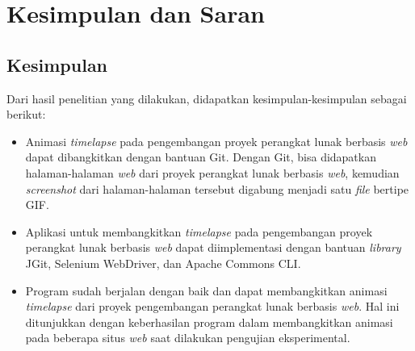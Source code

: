 \chapter{Kesimpulan dan Saran}
\label{chap:kesimpulan_dan_saran}

\section{Kesimpulan}
\label{sec:kesimpulan}
Dari hasil penelitian yang dilakukan, didapatkan kesimpulan-kesimpulan sebagai berikut:
\begin{itemize}
\item Animasi \textit{timelapse} pada pengembangan proyek perangkat lunak berbasis \textit{web} dapat dibangkitkan dengan bantuan Git. Dengan Git, bisa didapatkan halaman-halaman \textit{web} dari proyek perangkat lunak berbasis \textit{web}, kemudian \textit{screenshot} dari halaman-halaman tersebut digabung menjadi satu \textit{file} bertipe GIF.
\item  Aplikasi untuk membangkitkan \textit{timelapse} pada pengembangan proyek perangkat lunak berbasis \textit{web} dapat diimplementasi dengan bantuan \textit{library} JGit, Selenium WebDriver, dan Apache Commons CLI.

\item Program sudah berjalan dengan baik dan dapat membangkitkan animasi \textit{timelapse} dari proyek pengembangan perangkat lunak berbasis \textit{web}. Hal ini ditunjukkan dengan keberhasilan program dalam membangkitkan animasi pada beberapa situs \textit{web} saat dilakukan pengujian eksperimental.








\end{itemize}
